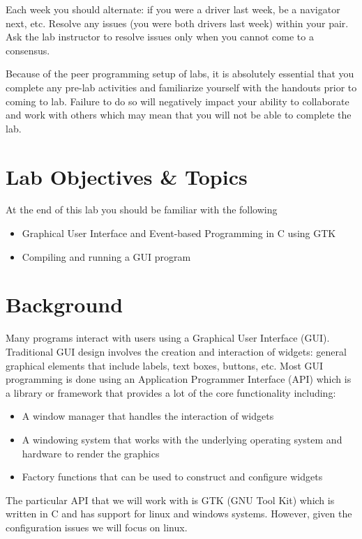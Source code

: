 \documentclass[12pt]{scrartcl}
\begin{document}
Each week you should alternate: if you were a driver last week, 
be a navigator next, etc.  Resolve any issues (you were both drivers
last week) within your pair.  Ask the lab instructor to resolve issues
only when you cannot come to a consensus.  

Because of the peer programming setup of labs, it is absolutely 
essential that you complete any pre-lab activities and familiarize
yourself with the handouts prior to coming to lab.  Failure to do
so will negatively impact your ability to collaborate and work with 
others which may mean that you will not be able to complete the
lab.  

\section{Lab Objectives \& Topics}
At the end of this lab you should be familiar with the following
\begin{itemize}
  \item Graphical User Interface and Event-based Programming in C using GTK
  \item Compiling and running a GUI program
\end{itemize}

\section{Background}

Many programs interact with users using a Graphical User 
Interface (GUI).  Traditional GUI design involves the creation 
and interaction of widgets: general graphical elements that 
include labels, text boxes, buttons, etc.  Most GUI programming 
is done using an Application Programmer Interface (API) 
which is a library or framework that provides a lot of the core 
functionality including:
\begin{itemize}
  \item A window manager that handles the interaction of widgets
  \item A windowing system that works with the underlying operating 
  	system and hardware to render the graphics
  \item Factory functions that can be used to construct and configure widgets
\end{itemize}
The particular API that we will work with is GTK (GNU Tool Kit) which 
is written in C and has support for linux and windows systems.  
However, given the configuration issues we will focus on linux.  
\end{document}
